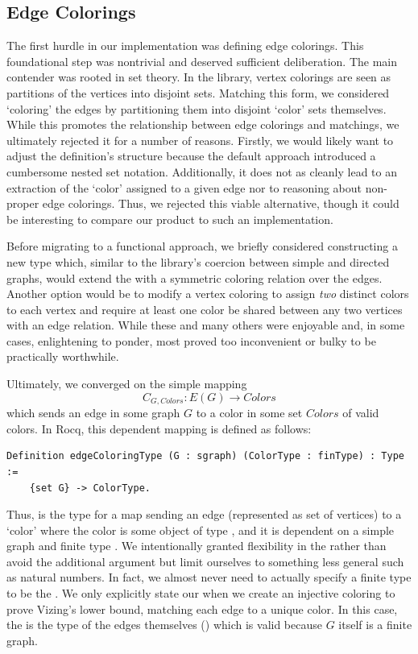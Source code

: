 \subsection{Edge Colorings}
The first hurdle in our implementation was defining edge colorings. This foundational step was nontrivial and deserved sufficient deliberation. The main contender was rooted in set theory. In the library, vertex colorings are seen as partitions of the vertices into disjoint sets. Matching this form, we considered `coloring' the edges by partitioning them into disjoint `color' sets themselves. While this promotes the relationship between edge colorings and matchings, we ultimately rejected it for a number of reasons. Firstly, we would likely want to adjust the definition’s structure because the default approach introduced a cumbersome nested set notation. Additionally, it does not as cleanly lead to an extraction of the `color' assigned to a given edge nor to reasoning about non-proper edge colorings. Thus, we rejected this viable alternative, though it could be interesting to compare our product to such an implementation. 

Before migrating to a functional approach, we briefly considered constructing a new  type which, similar to the library’s coercion between simple and directed graphs, would extend the  with a symmetric coloring relation over the edges. Another option would be to modify a vertex coloring to assign \emph{two} distinct colors to each vertex and require at least one color be shared between any two vertices with an edge relation. While these and many others were enjoyable and, in some cases, enlightening to ponder, most proved too inconvenient or bulky to be practically worthwhile.

Ultimately, we converged on the simple mapping 
$$ C_{G, Colors} : E(G) \to Colors$$
which sends an edge in some graph $G$ to a color in some set $Colors$ of valid colors. In Rocq, this dependent mapping is defined as follows:
\begin{verbatim}
Definition edgeColoringType (G : sgraph) (ColorType : finType) : Type := 
    {set G} -> ColorType.
\end{verbatim}
Thus,  is the type for a map sending an edge (represented as set of vertices) to a `color' where the color is some object of type , and it is dependent on a simple graph  and finite type . We intentionally granted flexibility in the  rather than avoid the additional argument but limit ourselves to something less general such as natural numbers. In fact, we almost never need to actually specify a finite type to be the . We only explicitly state our  when we create an injective coloring to prove Vizing's lower bound, matching each edge to a unique color. In this case, the  is the type of the edges themselves () which is valid because $G$ itself is a finite graph.

